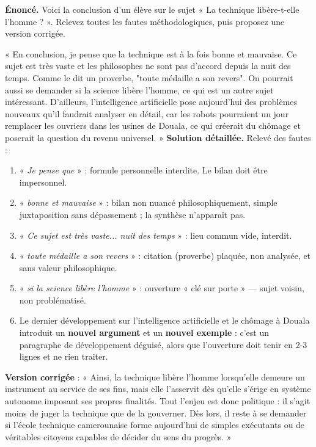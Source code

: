 \documentclass[11pt]{article}
\begin{document}
\begin{exoresolu}
\textbf{Énoncé.} Voici la conclusion d'un élève sur le sujet « La technique libère-t-elle l'homme ? ». Relevez toutes les fautes méthodologiques, puis proposez une version corrigée.

« En conclusion, je pense que la technique est à la fois bonne et mauvaise. Ce sujet est très vaste et les philosophes ne sont pas d'accord depuis la nuit des temps. Comme le dit un proverbe, "toute médaille a son revers". On pourrait aussi se demander si la science libère l'homme, ce qui est un autre sujet intéressant. D'ailleurs, l'intelligence artificielle pose aujourd'hui des problèmes nouveaux qu'il faudrait analyser en détail, car les robots pourraient un jour remplacer les ouvriers dans les usines de Douala, ce qui créerait du chômage et poserait la question du revenu universel. »
\tcblower
\textbf{Solution détaillée.} Relevé des fautes :
\begin{enumerate}
\item « \emph{Je pense que} » : formule personnelle interdite. Le bilan doit être impersonnel.
\item « \emph{bonne et mauvaise} » : bilan non nuancé philosophiquement, simple juxtaposition sans dépassement ; la synthèse n'apparaît pas.
\item « \emph{Ce sujet est très vaste... nuit des temps} » : lieu commun vide, interdit.
\item « \emph{toute médaille a son revers} » : citation (proverbe) plaquée, non analysée, et sans valeur philosophique.
\item « \emph{si la science libère l'homme} » : ouverture « clé sur porte » — sujet voisin, non problématisé.
\item Le dernier développement sur l'intelligence artificielle et le chômage à Douala introduit un \textbf{nouvel argument} et un \textbf{nouvel exemple} : c'est un paragraphe de développement déguisé, alors que l'ouverture doit tenir en 2-3 lignes et ne rien traiter.
\end{enumerate}
\textbf{Version corrigée} : « Ainsi, la technique libère l'homme lorsqu'elle demeure un instrument au service de ses fins, mais elle l'asservit dès qu'elle s'érige en système autonome imposant ses propres finalités. Tout l'enjeu est donc politique : il s'agit moins de juger la technique que de la gouverner. Dès lors, il reste à se demander si l'école technique camerounaise forme aujourd'hui de simples exécutants ou de véritables citoyens capables de décider du sens du progrès. »
\end{exoresolu}
\end{document}
